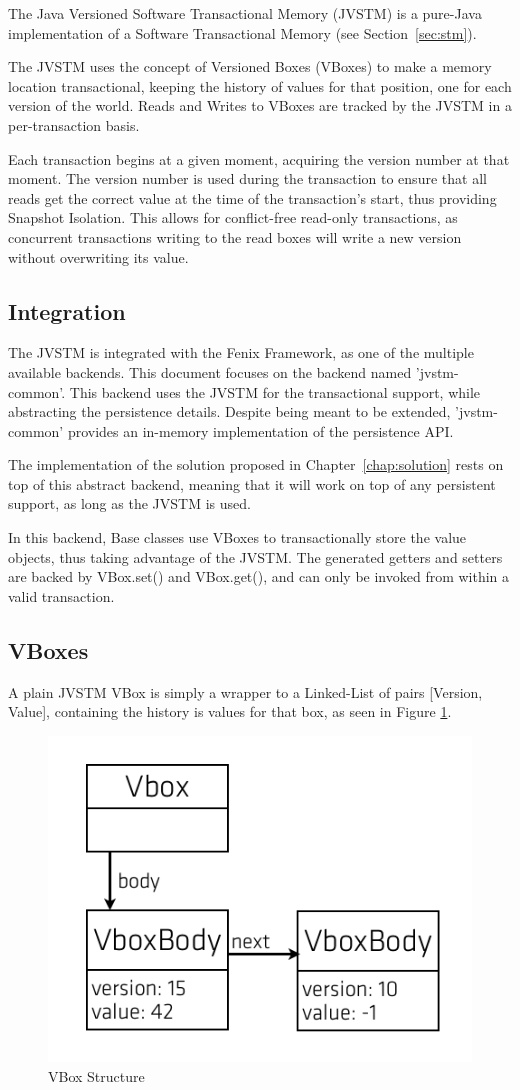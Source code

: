 The Java Versioned Software Transactional Memory (JVSTM)
\cite{cachopo2006versioned} is a pure-Java implementation of a
Software Transactional Memory (see Section~\ref{sec:stm}).

The JVSTM uses the concept of Versioned Boxes (VBoxes) to make a
memory location transactional, keeping the history of values for that
position, one for each version of the world. Reads and Writes to
VBoxes are tracked by the JVSTM in a per-transaction basis. 

Each transaction begins at a given moment, acquiring the version
number at that moment. The version number is used during the
transaction to ensure that all reads get the correct value at the time
of the transaction's start, thus providing Snapshot Isolation. This
allows for conflict-free read-only transactions, as concurrent
transactions writing to the read boxes will write a new version
without overwriting its value.

\subsection{Integration}

The JVSTM is integrated with the Fenix Framework, as one of the
multiple available backends. This document focuses on the backend
named 'jvstm-common'. This backend uses the JVSTM for the
transactional support, while abstracting the persistence
details. Despite being meant to be extended, 'jvstm-common' provides
an in-memory implementation of the persistence API.

The implementation of the solution proposed in
Chapter~\ref{chap:solution} rests on top of this abstract backend,
meaning that it will work on top of any persistent support, as long as
the JVSTM is used.

In this backend, Base classes use VBoxes to transactionally store the
value objects, thus taking advantage of the JVSTM. The generated
getters and setters are backed by VBox.set() and VBox.get(), and can
only be invoked from within a valid transaction.

\subsection{VBoxes}

A plain JVSTM VBox is simply a wrapper to a Linked-List of pairs
[Version, Value], containing the history is values for that
box, as seen in Figure \ref{fig:vbox}.

\begin{figure}
\centering
\includegraphics[width=0.5\linewidth]{vbox-list}
\caption{VBox Structure}
\label{fig:vbox}
\end{figure}


